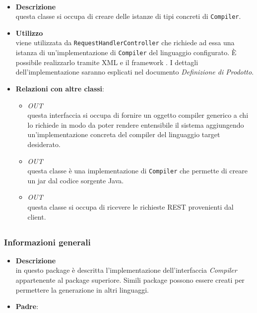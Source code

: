 \paragraph{}
\label{\nogloxy{SWEDesigner::Server::Compiler::CompilerAssembler}}
\begin{itemize}
\item \textbf{Descrizione}\\
questa classe si occupa di creare delle istanze di tipi concreti di \texttt{Compiler}. 
\item \textbf{Utilizzo}\\
viene utilizzata da \texttt{RequestHandlerController} che richiede ad essa una istanza di un'implementazione di \texttt{Compiler} del linguaggio configurato. È possibile realizzarlo tramite XML e il framework \spring{}. I dettagli dell'implementazione saranno esplicati nel documento \emph{Definizione di Prodotto}. %
\item \textbf{Relazioni con altre classi}:
\begin{itemize}
\item \textit{OUT} \hyperref[\nogloxy{SWEDesigner::Server::Compiler::Compiler}]{}\\
questa interfaccia si occupa di fornire un oggetto compiler generico a chi lo richiede in modo da poter rendere entensibile il sistema aggiungendo un'implementazione concreta del compiler del linguaggio target desiderato.
\item \textit{OUT} \hyperref[\nogloxy{SWEDesigner::Server::Compiler::Java::JavaCompiler}]{}\\
questa classe è una implementazione di \texttt{Compiler} che permette di creare un jar dal codice sorgente Java.
\item \textit{OUT} \hyperref[\nogloxy{SWEDesigner::Server::Controller::RequestHandlerController}]{}\\
questa classe si occupa di ricevere le richieste REST provenienti dal client.
\end{itemize}
\end{itemize}
\subsection{}
\label{\nogloxy{SWEDesigner::Server::Compiler::Java}}
\subsubsection{Informazioni generali}
\begin{itemize}
\item \textbf{Descrizione}\\
in questo package è descritta l'implementazione dell'interfaccia \emph{Compiler} appartenente al package superiore. Simili package possono essere creati per permettere la generazione in altri linguaggi.
\item \textbf{Padre}: \hyperref[\nogloxy{SWEDesigner::Server::Compiler}]{}
\end{itemize}
